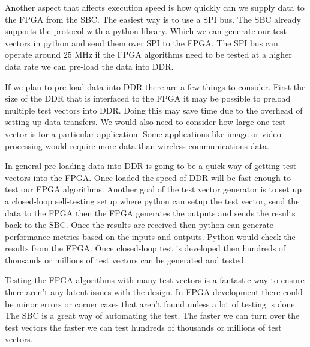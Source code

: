 Another aspect that affects execution speed is how quickly can we supply data to the \ac{FPGA} from the \ac{SBC}. The easiest way is to use a \ac{SPI} bus. The \ac{SBC} already supports the protocol with a python library. Which we can generate our test vectors in python and send them over \ac{SPI} to the \ac{FPGA}. The \ac{SPI} bus can operate around $25$ \ac{MHz} if the \ac{FPGA} algorithms need to be tested at a higher data rate we can pre-load the data into \ac{DDR}. 

If we plan to pre-load data into \ac{DDR} there are a few things to consider. First the size of the \ac{DDR} that is interfaced to the \ac{FPGA} it may be possible to preload multiple test vectors into \ac{DDR}. Doing this may save time due to the overhead of setting up data transfers. We would also need to consider how large one test vector is for a particular application. Some applications like image or video processing would require more data than wireless communications data.

In general pre-loading data into \ac{DDR} is going to be a quick way of getting test vectors into the \ac{FPGA}. Once loaded the speed of \ac{DDR} will be fast enough to test our \ac{FPGA} algorithms. Another goal of the test vector generator is to set up a closed-loop self-testing setup where python can setup the test vector, send the data to the \ac{FPGA} then the \ac{FPGA} generates the outputs and sends the results back to the \ac{SBC}. Once the results are received then python can generate performance metrics based on the inputs and outputs. Python would check the results from the \ac{FPGA}. Once closed-loop test is developed then hundreds of thousands or millions of test vectors can be generated and tested.

Testing the \ac{FPGA} algorithms with many test vectors is a fantastic way to ensure there aren't any latent issues with the design. In \ac{FPGA} development there could be minor errors or corner cases that aren't found unless a lot of testing is done. The \ac{SBC} is a great way of automating the test. The faster we can turn over the test vectors the faster we can test hundreds of thousands or millions of test vectors. 

